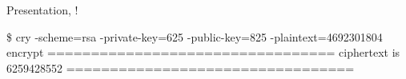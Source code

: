 \documentclass{beamer}
\title{\deliv{\pp}{Presentation}}
\begin{document}
\maketitle


\begin{frame}
Presentation, \cry!
\end{frame}


\begin{frame}
\begin{codes}
\alice \$ cry -scheme=rsa -private-key=625 -public-key=825 -plaintext=4692301804 encrypt
=================================
ciphertext is 6259428552
=================================
\end{codes}
\end{frame}

\end{document}
